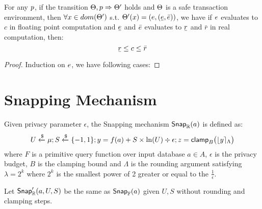 \documentclass[a4paper,11pt]{article}
\begin{document}
\begin{thm}

For any $p$, if the transition 
$\Theta, p \Rightarrow \Theta'$ holds and $\Theta$ is a safe transaction environment, 
then $\forall x \in dom(\Theta')$ s.t. $\trsenv'(x) =(\expr, (\ubar{\expr}, \bar{\expr}))$, we have
if $e$ evaluates to $c$ in floating point computation and 
$\ubar{\expr}$ and $\bar{e}$ evaluates to $\ubar{r}$ and $\bar{r}$ in real computation, then: 
\[
\ubar{r} \leq c \leq \bar{r}
\]
\end{thm}
\begin{proof}
Induction on $e$, we have following cases:

\end{proof}

\newpage
\section{Snapping Mechanism}

\begin{defn}
Given privacy parameter $\epsilon$, the Snapping mechanism $\mathsf{Snap}_{\mathbb{R}}(a)$ is defined as:
\[
	U \xleftarrow{\$} \mu; S \xleftarrow{\$} \{-1, 1\};
	y = f(a) + S \times \ln (U) \div \epsilon;
	z = \mathsf{clamp}_B \big(
	\lfloor y \rceil_{\Lambda}
	\big)
\]
where $F$ is a primitive query function over input database $a \in A$, $\epsilon$ is the privacy budget, $B$ is the clamping bound and $\Lambda$ is the rounding argument satisfying $\lambda = 2^k$ where $2^k$ is the smallest power of 2 greater or equal to the $\frac{1}{\epsilon}$.
%

%
Let $\mathsf{Snap}_{\mathbb{R}}'(a, U, S)$ be the same as $\mathsf{Snap}_{\mathbb{F}}(a)$ given $U, S$ without rounding and clamping steps.
\end{defn}


\end{document}
